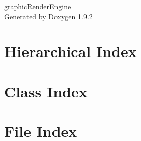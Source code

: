 \documentclass[twoside]{book}
\newcommand{\+}{\discretionary{\mbox{\scriptsize$\hookleftarrow$}}{}{}}
\newcommand{\clearemptydoublepage}{%
    \newpage{\pagestyle{empty}\cleardoublepage}%
  }
\begin{document}
  \raggedbottom
    \hypersetup{pageanchor=false,
                bookmarksnumbered=true,
                pdfencoding=unicode
               }
  \begin{titlepage}
  \vspace*{7cm}
  \begin{center}%
  {\Large graphic\+Render\+Engine}\\
  \vspace*{1cm}
  {\large Generated by Doxygen 1.9.2}\\
  \end{center}
  \end{titlepage}
  \clearemptydoublepage
  \tableofcontents
  \clearemptydoublepage
  \hypersetup{pageanchor=true}
\chapter{Hierarchical Index}

\chapter{Class Index}

\chapter{File Index}

\end{document}
